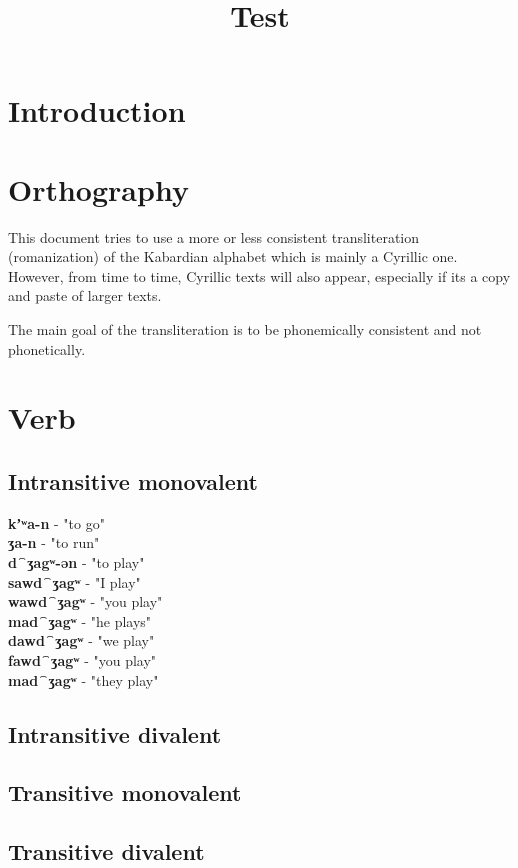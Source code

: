 \documentclass[a4paper,12pt]{book}
\title{Test}
\newcommand{\1}[1]{\textbf{\emph{#1}}} %
\newcommand{\2}[1]{\textbf{[#1]}} %
\newcommand{\3}[1]{\fontsize{11pt}{0cm}\textbf{\emph{#1}}} %
\newcommand{\4}[1]{\fontsize{10pt}{0cm}\emph{#1}}	%
\newcommand{\5}[1]{\textbf{/#1/}} %
\newcommand{\6}[1]{\textbf{[#1]}} %
\newcommand{\7}[1]{\fontsize{12pt}{0cm}\emph{#1}} %
\newcommand{\8}[1]{\fontsize{12pt}{0cm}`#1'} %
\newcommand{\9}[1]{\fontsize{12pt}{0cm}(lit. `#1')} %
\begin{document}
\frontmatter
\maketitle\newpage
\setcounter{secnumdepth}{4}
\setcounter{tocdepth}{4}

\newpage
\mainmatter

\chapter{Introduction}
\chapter{Orthography}
This document tries to use a more or less consistent transliteration (romanization) of the Kabardian alphabet which is mainly a Cyrillic one. However, from time to time, Cyrillic texts will also appear, especially if its a copy and paste of larger texts.

The main goal of the transliteration is to be phonemically consistent and not phonetically.
\chapter{Verb}
\section{Intransitive monovalent}
\textbf{kʼʷa-n} - "to go"\\
\textbf{ʒa-n} - "to run"\\
\textbf{d⁀ʒagʷ-ən} - "to play"\\


\textbf{sawd⁀ʒagʷ} - "I play"\\
\textbf{wawd⁀ʒagʷ} - "you play"\\
\textbf{mad⁀ʒagʷ} - "he plays"\\
\textbf{dawd⁀ʒagʷ} - "we play"\\
\textbf{fawd⁀ʒagʷ} - "you play"\\
\textbf{mad⁀ʒagʷ} - "they play"\\


\section{Intransitive divalent}
\section{Transitive monovalent}
\section{Transitive divalent}
\end{document}
